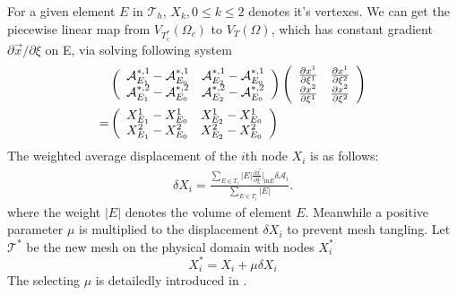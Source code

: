 \documentclass{eajam}
\begin{document}
      For a given element $E$ in $\mathcal{T}_h$,  $X_k, 0 \leq k \leq
      2$ denotes it's vertexes. We can get the piecewise linear map from
      $V_{T_c^*}(\Omega_c)$ to $V_T(\Omega)$, which has constant gradient 
      $\partial \vec{x} / \partial \xi $ on E, via solving following
      system
      \begin{eqnarray}
        \begin{aligned}
          & \left (
            \begin{array}{cc}
              \mathcal{A}_{E_1}^{*, 1} - \mathcal{A}_{E_0}^{*, 1} & 
              \mathcal{A}_{E_2}^{*, 1} - \mathcal{A}_{E_0}^{*, 1} \\
              \mathcal{A}_{E_1}^{*, 2} - \mathcal{A}_{E_0}^{*, 2} &
              \mathcal{A}_{E_2}^{*, 2} - \mathcal{A}_{E_0}^{*, 2} 
            \end{array} 
          \right )
          \left (
            \begin{array}{cc}
              \frac{\partial x^1}{\partial \xi^1} & \frac{\partial
                x^1}{\partial \xi^2} \\
              \frac{\partial x^2}{\partial
                \xi^1} & \frac{\partial x^2}{\partial \xi^2}
            \end{array}
          \right ) \notag \\ = & 
          \left (
            \begin{array}{ll}
              X_{E_1}^1 - X_{E_0}^1 & X_{E_2}^1 - X_{E_0}^1 \\
              X_{E_1}^2 - X_{E_0}^2 & X_{E_2}^2 - X_{E_0}^2 
            \end{array}
          \right )
        \end{aligned}
      \end{eqnarray}
      The weighted average displacement of the $i$th node $X_i$ is as
      follows:
      \begin{eqnarray}
        \delta X_i = \frac{\sum\limits_{E \in T_i} |E| \frac{\partial
            \vec{x}}{\partial \xi}|_{\text{in} E} \delta
          \mathcal{A}_i}{\sum\limits_{E \in T_i} |E|}.
      \end{eqnarray}
      where the weight $|E|$ denotes the volume of element $E$.
      Meanwhile a positive parameter $\mu$ is multiplied to the 
      displacement $\delta X_i$ to prevent mesh
      tangling. Let $\mathcal{T}^*$ be the new mesh on the physical
      domain with nodes $X_i^*$
      \begin{equation}
        X_i^* = X_i + \mu \delta X_i
      \end{equation}
      The selecting $\mu$ is detailedly introduced in \cite{di2005moving}. 
\end{document}
